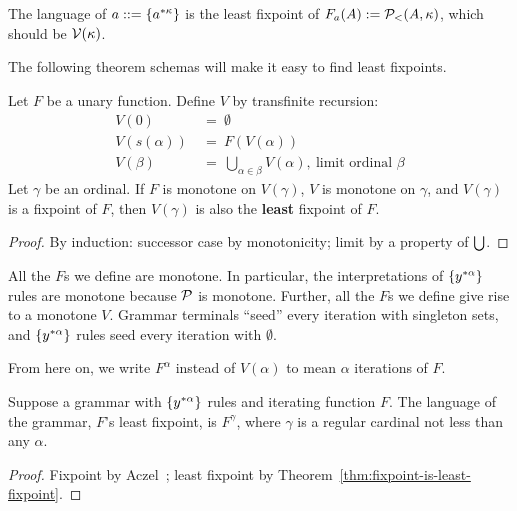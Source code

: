 \begin{example}
The language of $a ::= \{{{a}^{*{\kappa}}}\}$ is the least fixpoint of $F_a(A) := \mathcal{P}_<(A,\kappa)$, which should be $\mathcal{V}(\kappa)$.
\exampleqed
\end{example}

The following theorem schemas will make it easy to find least fixpoints.

\begin{theorem}
\label{thm:fixpoint-is-least-fixpoint}
Let $F$ be a unary function. Define $V$ by transfinite recursion:
\begin{equation}
\begin{aligned}
	V(0) &\ =\ \emptyset \\
	V(s(\alpha)) &\ =\ F(V(\alpha)) \\
	V(\beta) &\ =\ \bigcup_{\alpha \in \beta} V(\alpha),\ \text{limit ordinal } \beta
\end{aligned}
\end{equation}
Let $\gamma$ be an ordinal. If $F$ is monotone on $V(\gamma)$, $V$ is monotone on $\gamma$, and $V(\gamma)$ is a fixpoint of $F$, then $V(\gamma)$ is also the \textbf{least} fixpoint of $F$.
\end{theorem}
\begin{proof}
By induction: successor case by monotonicity; limit by a property of $\textstyle\bigcup$.
\end{proof}

All the $F$s we define are monotone. In particular, the interpretations of $\{{{y}^{*{\alpha}}}\}$ rules are monotone because $\mathcal{P}$ is monotone. Further, all the $F$s we define give rise to a monotone $V$. Grammar terminals ``seed'' every iteration with singleton sets, and $\{{{y}^{*{\alpha}}}\}$ rules seed every iteration with $\emptyset$.

From here on, we write $F^\alpha$ instead of $V(\alpha)$ to mean $\alpha$ iterations of $F$.

\begin{theorem}
\label{thm:grammar-fixpoint}
Suppose a grammar with $\{{{y}^{*{\alpha}}}\}$ rules and iterating function $F$. The language of the grammar, $F$'s least fixpoint, is $F^\gamma$, where $\gamma$ is a regular cardinal not less than any $\alpha$.
\end{theorem}
\begin{proof}
Fixpoint by Aczel~\cite[Theorem 1.3.4]{cit:aczel-1977-inductive}; least fixpoint by Theorem~\ref{thm:fixpoint-is-least-fixpoint}.
\end{proof}

